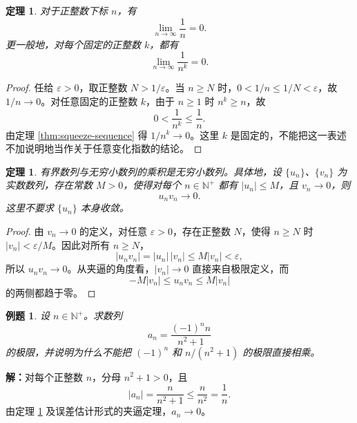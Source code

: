 \documentclass[UTF8,fontset=fandol,11pt]{ctexart}
\newtheorem{theorem}[definition]{定理}
\newtheorem{example}[definition]{例题}
\begin{document}
\begin{theorem}
\label{thm:basic-reciprocal-limit}对于正整数下标 $n$，有
\[
\lim_{n\to\infty}\frac1n=0.
\]
更一般地，对每个固定的正整数 $k$，都有
\[
\lim_{n\to\infty}\frac1{n^k}=0.
\]
\end{theorem}
\begin{proof}
任给 $\varepsilon>0$，取正整数 $N>1/\varepsilon$。当 $n\geq N$ 时，$0<1/n\leq1/N<\varepsilon$，故 $1/n\to0$。对任意固定的正整数 $k$，由于 $n\geq1$ 时 $n^k\geq n$，故
\[
0<\frac1{n^k}\leq\frac1n.
\]
由定理 \ref{thm:squeeze-sequence} 得 $1/n^k\to0$。这里 $k$ 是固定的，不能把这一表述不加说明地当作关于任意变化指数的结论。
\end{proof}
\begin{theorem}
\label{thm:bounded-times-zero}有界数列与无穷小数列的乘积是无穷小数列。具体地，设 $\{u_n\}$、$\{v_n\}$ 为实数数列，存在常数 $M>0$，使得对每个 $n\in\mathbb{N}^{+}$ 都有 $|u_n|\leq M$，且 $v_n\to0$，则
\[
u_nv_n\to0.
\]
这里不要求 $\{u_n\}$ 本身收敛。
\end{theorem}
\begin{proof}
由 $v_n\to0$ 的定义，对任意 $\varepsilon>0$，存在正整数 $N$，使得 $n\geq N$ 时 $|v_n|<\varepsilon/M$。因此对所有 $n\geq N$，
\[
|u_nv_n|=|u_n|\,|v_n|\leq M|v_n|<\varepsilon,
\]
所以 $u_nv_n\to0$。从夹逼的角度看，$|v_n|\to0$ 直接来自极限定义，而
\[
-M|v_n|\leq u_nv_n\leq M|v_n|
\]
的两侧都趋于零。
\end{proof}
\begin{example}
设 $n\in\mathbb{N}^{+}$。求数列
\[
a_n=\frac{(-1)^n n}{n^2+1}
\]
的极限，并说明为什么不能把 $(-1)^n$ 和 $n/(n^2+1)$ 的极限直接相乘。
\end{example}
\par\noindent\textbf{解：}对每个正整数 $n$，分母 $n^2+1>0$，且
\[
|a_n|=\frac{n}{n^2+1}\leq\frac{n}{n^2}=\frac1n.
\]
由定理 \ref{thm:basic-reciprocal-limit} 及误差估计形式的夹逼定理，$a_n\to0$。
\end{document}
